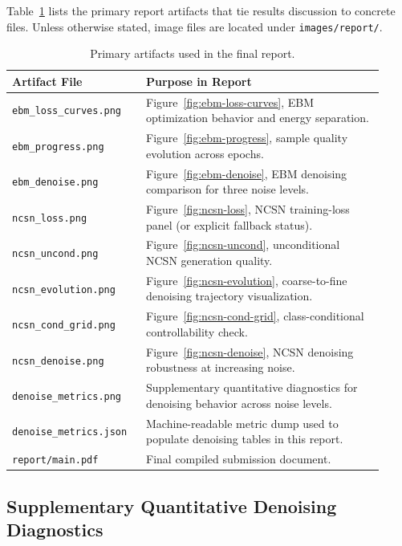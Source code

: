 Table~\ref{tab:artifact-inventory} lists the primary report artifacts that tie
results discussion to concrete files. Unless otherwise stated, image files are
located under \texttt{images/report/}.

\begin{table}[H]
\centering
\caption{Primary artifacts used in the final report.}
\label{tab:artifact-inventory}
\begin{tabular}{@{}p{0.32\linewidth}p{0.60\linewidth}@{}}
\toprule
\textbf{Artifact File} & \textbf{Purpose in Report} \\
\midrule
\texttt{ebm\_loss\_curves.png} & Figure~\ref{fig:ebm-loss-curves},
EBM optimization behavior and energy separation. \\
\texttt{ebm\_progress.png} & Figure~\ref{fig:ebm-progress},
sample quality evolution across epochs. \\
\texttt{ebm\_denoise.png} & Figure~\ref{fig:ebm-denoise},
EBM denoising comparison for three noise levels. \\
\texttt{ncsn\_loss.png} & Figure~\ref{fig:ncsn-loss},
NCSN training-loss panel (or explicit fallback status). \\
\texttt{ncsn\_uncond.png} & Figure~\ref{fig:ncsn-uncond},
unconditional NCSN generation quality. \\
\texttt{ncsn\_evolution.png} & Figure~\ref{fig:ncsn-evolution},
coarse-to-fine denoising trajectory visualization. \\
\texttt{ncsn\_cond\_grid.png} & Figure~\ref{fig:ncsn-cond-grid},
class-conditional controllability check. \\
\texttt{ncsn\_denoise.png} & Figure~\ref{fig:ncsn-denoise},
NCSN denoising robustness at increasing noise. \\
\texttt{denoise\_metrics.png} & Supplementary quantitative diagnostics
for denoising behavior across noise levels. \\
\texttt{denoise\_metrics.json} & Machine-readable metric dump used to
populate denoising tables in this report. \\
\texttt{report/main.pdf} & Final compiled submission document. \\
\bottomrule
\end{tabular}
\end{table}

\subsection{Supplementary Quantitative Denoising Diagnostics}

